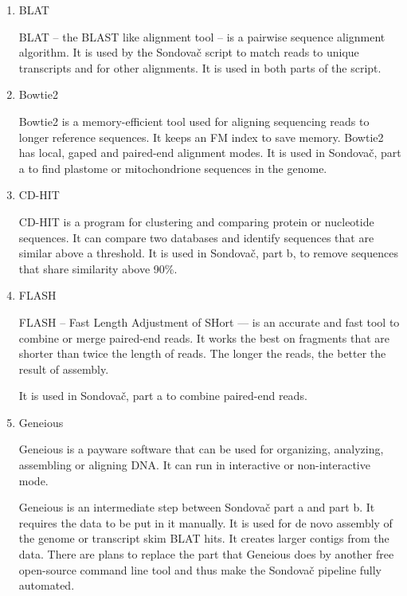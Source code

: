 \begin{enumerate}


\item BLAT

BLAT -- the BLAST like alignment tool -- is a pairwise sequence alignment algorithm. \cite{kent2002blat}
It is used by the Sondovač script to match reads to unique transcripts and for other alignments. It is used 
in both parts of the script. 

\item Bowtie2

Bowtie2 is a memory-efficient tool used for aligning sequencing reads to longer reference sequences. It keeps an FM index to save memory. Bowtie2 has 
local, gaped and paired-end alignment modes. \cite{bowtie2}
It is used in Sondovač, part a to find plastome or mitochondrione sequences in the genome. 

\item CD-HIT

CD-HIT is a program for clustering and comparing protein or nucleotide sequences. It can compare two databases and identify sequences that 
are similar above a threshold. \cite{cd-hit}
It is used in Sondovač, part b, to remove sequences that share similarity above 90\%. 



\item FLASH

FLASH -- Fast Length Adjustment of SHort --- is an accurate and fast tool to combine or merge paired-end reads. It works the best 
on fragments that are shorter than twice the length of reads. The longer the reads, the better the result of assembly. 
\cite{flash}

It is used in Sondovač, part a to combine paired-end reads. 

\item Geneious

Geneious is a payware software that can be used for organizing, analyzing, assembling or aligning DNA. It can run in interactive or non-interactive mode. 

Geneious is an intermediate step between Sondovač part a and part b. It requires the data to be put in it manually. It is used for de novo assembly 
of the genome or transcript skim BLAT hits. It creates larger contigs from the data. 
There are plans to replace the part that Geneious does by another free open-source command line tool and thus make the Sondovač pipeline fully automated. 


\end{enumerate}
